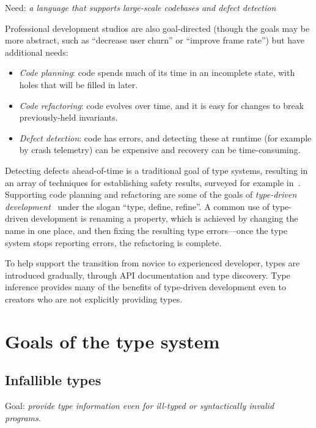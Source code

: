 \documentclass[acmsmall]{acmart}
\begin{document}
Need: \emph{a language that supports large-scale codebases and defect detection}

Professional development studios are also goal-directed (though the
goals may be more abstract, such as ``decrease user churn'' or
``improve frame rate'') but have additional needs:
\begin{itemize}

\item \emph{Code planning}:
  code spends much of its time in an incomplete state, with holes
  that will be filled in later.

\item \emph{Code refactoring}:
  code evolves over time, and it is easy for changes to
  break previously-held invariants.

\item \emph{Defect detection}:
  code has errors, and detecting these at runtime (for example by crash telemetry)
  can be expensive and recovery can be time-consuming.
  
\end{itemize}
Detecting defects ahead-of-time is a traditional goal of type systems,
resulting in an array of techniques for establishing safety results,
surveyed for example in~\cite{TAPL}. Supporting code planning and
refactoring are some of the goals of \emph{type-driven
development}~\cite{TDDIdris} under the slogan ``type, define,
refine''.  A common use of type-driven development is renaming a
property, which is achieved by changing the name in one place,
and then fixing the resulting type errors---once the type system stops
reporting errors, the refactoring is complete.

To help support the transition from novice to experienced developer,
types are introduced gradually, through API documentation and type discovery.
Type inference provides many of the benefits of type-driven development
even to creators who are not explicitly providing types.

\section{Goals of the type system}
\subsection{Infallible types}

Goal: \emph{provide type information even for ill-typed or syntactically invalid programs.}
\end{document}
